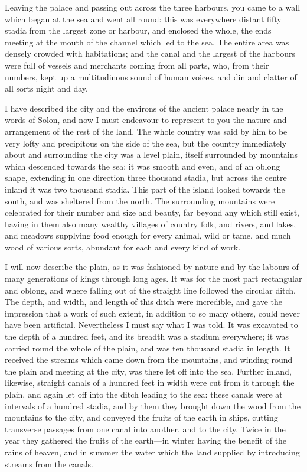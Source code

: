 \documentclass[11pt,letter]{article}
\begin{document}
\par  Leaving the palace and passing out across the three harbours, you came to a wall which began at the sea and went all round: this was everywhere distant fifty stadia from the largest zone or harbour, and enclosed the whole, the ends meeting at the mouth of the channel which led to the sea. The entire area was densely crowded with habitations; and the canal and the largest of the harbours were full of vessels and merchants coming from all parts, who, from their numbers, kept up a multitudinous sound of human voices, and din and clatter of all sorts night and day.

\par  I have described the city and the environs of the ancient palace nearly in the words of Solon, and now I must endeavour to represent to you the nature and arrangement of the rest of the land. The whole country was said by him to be very lofty and precipitous on the side of the sea, but the country immediately about and surrounding the city was a level plain, itself surrounded by mountains which descended towards the sea; it was smooth and even, and of an oblong shape, extending in one direction three thousand stadia, but across the centre inland it was two thousand stadia. This part of the island looked towards the south, and was sheltered from the north. The surrounding mountains were celebrated for their number and size and beauty, far beyond any which still exist, having in them also many wealthy villages of country folk, and rivers, and lakes, and meadows supplying food enough for every animal, wild or tame, and much wood of various sorts, abundant for each and every kind of work.

\par  I will now describe the plain, as it was fashioned by nature and by the labours of many generations of kings through long ages. It was for the most part rectangular and oblong, and where falling out of the straight line followed the circular ditch. The depth, and width, and length of this ditch were incredible, and gave the impression that a work of such extent, in addition to so many others, could never have been artificial. Nevertheless I must say what I was told. It was excavated to the depth of a hundred feet, and its breadth was a stadium everywhere; it was carried round the whole of the plain, and was ten thousand stadia in length. It received the streams which came down from the mountains, and winding round the plain and meeting at the city, was there let off into the sea. Further inland, likewise, straight canals of a hundred feet in width were cut from it through the plain, and again let off into the ditch leading to the sea: these canals were at intervals of a hundred stadia, and by them they brought down the wood from the mountains to the city, and conveyed the fruits of the earth in ships, cutting transverse passages from one canal into another, and to the city. Twice in the year they gathered the fruits of the earth—in winter having the benefit of the rains of heaven, and in summer the water which the land supplied by introducing streams from the canals.
\end{document}
